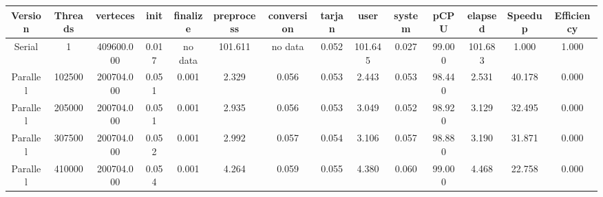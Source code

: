 \begin{tabular}{|c|c|c|c|c|c|c|c|c|c|c|c|c|c|}
\toprule
 Version &  Threads &   verteces &  init & finalize &  preprocess & conversion &  tarjan &    user &  system &   pCPU &  elapsed &  Speedup &  Efficiency \\
\midrule
  Serial &        1 & 409600.000 & 0.017 &  no data &     101.611 &    no data &   0.052 & 101.645 &   0.027 & 99.000 &  101.683 &    1.000 &       1.000 \\
Parallel &   102500 & 200704.000 & 0.051 &    0.001 &       2.329 &      0.056 &   0.053 &   2.443 &   0.053 & 98.440 &    2.531 &   40.178 &       0.000 \\
Parallel &   205000 & 200704.000 & 0.051 &    0.001 &       2.935 &      0.056 &   0.053 &   3.049 &   0.052 & 98.920 &    3.129 &   32.495 &       0.000 \\
Parallel &   307500 & 200704.000 & 0.052 &    0.001 &       2.992 &      0.057 &   0.054 &   3.106 &   0.057 & 98.880 &    3.190 &   31.871 &       0.000 \\
Parallel &   410000 & 200704.000 & 0.054 &    0.001 &       4.264 &      0.059 &   0.055 &   4.380 &   0.060 & 99.000 &    4.468 &   22.758 &       0.000 \\
\bottomrule
\end{tabular}
